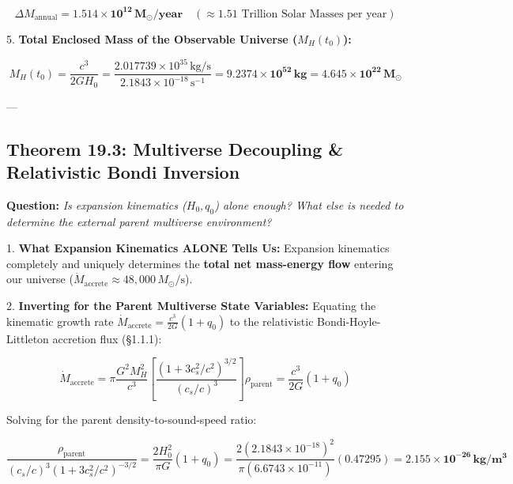 \documentclass[11pt,a4paper]{article}
\theoremstyle{definition}
\theoremstyle{remark}
\begin{document}
   
\begin{equation}
\boxed{\Delta M_{\text{annual}} = \mathbf{1.514 \times 10^{12} \, M_\odot / \text{year}} \quad (\approx 1.51 \text{ Trillion Solar Masses per year})}
\end{equation}


5. \textbf{Total Enclosed Mass of the Observable Universe ($M_H(t_0)$):}  
   
\begin{equation}
M_H(t_0) = \frac{c^3}{2 G H_0} = \frac{2.017739 \times 10^{35} \, \mathrm{kg/s}}{2.1843 \times 10^{-18} \, \mathrm{s^{-1}}} = \mathbf{9.2374 \times 10^{52} \, kg} = \mathbf{4.645 \times 10^{22} \, M_\odot}
\end{equation}


---

\subsection{Theorem 19.3: Multiverse Decoupling \& Relativistic Bondi Inversion}

\textbf{Question:} \textit{Is expansion kinematics ($H_0, q_0$) alone enough? What else is needed to determine the external parent multiverse environment?}

1. \textbf{What Expansion Kinematics ALONE Tells Us:}  
   Expansion kinematics completely and uniquely determines the \textbf{total net mass-energy flow} entering our universe ($\dot{M}_{\text{accrete}} \approx 48,000 \, M_\odot/\mathrm{s}$).

2. \textbf{Inverting for the Parent Multiverse State Variables:}  
   Equating the kinematic growth rate $\dot{M}_{\text{accrete}} = \frac{c^3}{2G}(1+q_0)$ to the relativistic Bondi-Hoyle-Littleton accretion flux (§1.1.1):
   
\begin{equation}
\dot{M}_{\text{accrete}} = \pi \frac{G^2 M_H^2}{c^3} [ \frac{(1 + 3 c_s^2/c^2)^{3/2}}{(c_s/c)^3} ] \rho_{\text{parent}} = \frac{c^3}{2 G}(1 + q_0)
\end{equation}

   Solving for the parent density-to-sound-speed ratio:
   
\begin{equation}
\boxed{\frac{\rho_{\text{parent}}}{(c_s/c)^3 \left( 1 + 3 c_s^2/c^2 \right)^{-3/2}} = \frac{2 H_0^2}{\pi G} (1 + q_0) = \frac{2 (2.1843 \times 10^{-18})^2}{\pi (6.6743 \times 10^{-11})} (0.47295) = \mathbf{2.155 \times 10^{-26} \, kg/m^3}}
\end{equation}
\end{document}
